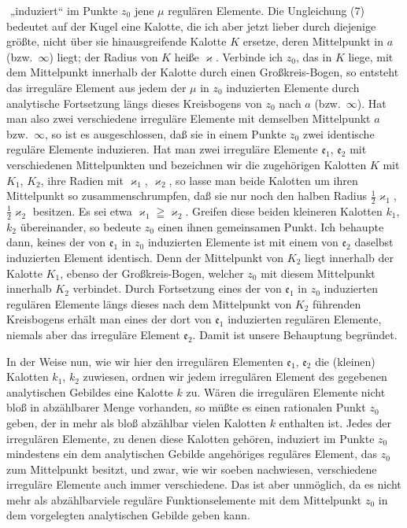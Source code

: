 \documentclass{article}
\begin{document}
﻿
„induziert“ im Punkte $z_0$ jene $\mu$ regulären Elemente. Die Ungleichung (7) bedeutet auf der Kugel eine Kalotte, die ich aber jetzt lieber durch diejenige größte, nicht über sie hinausgreifende Kalotte $K$ ersetze, deren Mittelpunkt in $a$ (bzw.\ $\infty$) liegt; der Radius von $K$ heiße $\varkappa$. Verbinde ich $z_0$, das in $K$ liege, mit dem Mittelpunkt innerhalb der Kalotte durch einen Großkreis-Bogen, so entsteht das irreguläre Element aus jedem der $\mu$ in $z_0$ induzierten Elemente durch analytische Fortsetzung längs dieses Kreisbogens von $z_0$ nach $a$ (bzw.\ $\infty$). Hat man also zwei verschiedene irreguläre Elemente mit demselben Mittelpunkt $a$ bzw.\ $\infty$, so ist es ausgeschlossen, daß sie in einem Punkte $z_0$ zwei identische reguläre Elemente induzieren. Hat man zwei irreguläre Elemente $\mathfrak{e}_1$, $\mathfrak{e}_2$ mit verschiedenen Mittelpunkten und bezeichnen wir die zugehörigen Kalotten $K$ mit $K_1$, $K_2$, ihre Radien mit $\varkappa_1$, $\varkappa_2$, so lasse man beide Kalotten um ihren Mittelpunkt so zusammenschrumpfen, daß sie nur noch den halben Radius $\frac{1}{2}\varkappa_1$, $\frac{1}{2}\varkappa_2$ besitzen. Es sei etwa $\varkappa_1 \geqq \varkappa_2$. Greifen diese beiden kleineren Kalotten $k_1$, $k_2$ übereinander, so bedeute $z_0$ einen ihnen gemeinsamen Punkt. Ich behaupte dann, keines der von $\mathfrak{e}_1$ in $z_0$ induzierten Elemente ist mit einem von $\mathfrak{e}_2$ daselbst induzierten Element identisch. Denn der Mittelpunkt von $K_2$ liegt innerhalb der Kalotte $K_1$, ebenso der Großkreis-Bogen, welcher $z_0$ mit diesem Mittelpunkt innerhalb $K_2$ verbindet. Durch Fortsetzung eines der von $\mathfrak{e}_1$ in $z_0$ induzierten regulären Elemente längs dieses nach dem Mittelpunkt von $K_2$ führenden Kreisbogens erhält man eines der dort von $\mathfrak{e}_1$ induzierten regulären Elemente, niemals aber das irreguläre Element $\mathfrak{e}_2$. Damit ist unsere Behauptung begründet.

In der Weise nun, wie wir hier den irregulären Elementen $\mathfrak{e}_1$, $\mathfrak{e}_2$ die (kleinen) Kalotten $k_1$, $k_2$ zuwiesen, ordnen wir jedem irregulären Element des gegebenen analytischen Gebildes eine Kalotte $k$ zu. Wären die irregulären Elemente nicht bloß in abzählbarer Menge vorhanden, so müßte es einen rationalen Punkt $z_0$ geben, der in mehr als bloß abzählbar vielen Kalotten $k$ enthalten ist. Jedes der irregulären Elemente, zu denen diese Kalotten gehören, induziert im Punkte $z_0$ mindestens ein dem analytischen Gebilde angehöriges reguläres Element, das $z_0$ zum Mittelpunkt besitzt, und zwar, wie wir soeben nachwiesen, verschiedene irreguläre Elemente auch immer verschiedene. Das ist aber unmöglich, da es nicht mehr als abzählbarviele reguläre Funktionselemente mit dem Mittelpunkt $z_0$ in dem vorgelegten analytischen Gebilde geben kann.
\end{document}
